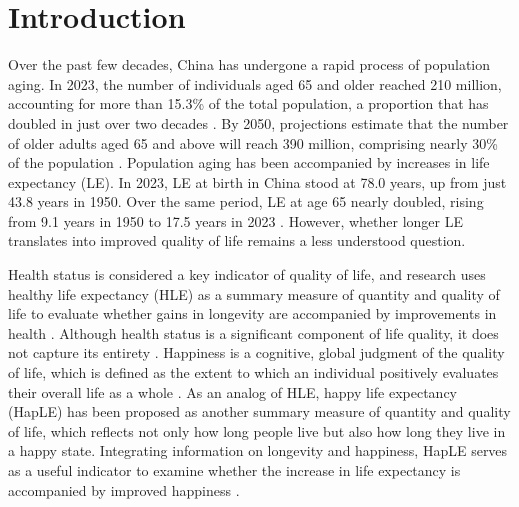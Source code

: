 \documentclass[12pt, a4paper]{article}
\begin{document}
\newpage
\section{Introduction}
Over the past few decades, China has undergone a rapid process of population aging. In 2023, the number of individuals aged 65 and older reached 210 million, accounting for more than 15.3\% of the total population, a proportion that has doubled in just over two decades \autocite{nationalbureauofstatisticsofchina.2023.china}. By 2050, projections estimate that the number of older adults aged 65 and above will reach 390 million, comprising nearly 30\% of the population \autocite{unitednations.2024.world}. Population aging has been accompanied by increases in life expectancy (LE). In 2023, LE at birth in China stood at 78.0 years, up from just 43.8 years in 1950. Over the same period, LE at age 65 nearly doubled, rising from 9.1 years in 1950 to 17.5 years in 2023 \autocite{unitednations.2024.world}. However, whether longer LE translates into improved quality of life remains a less understood question.

Health status is considered a key indicator of quality of life, and research uses healthy life expectancy (HLE) as a summary measure of quantity and quality of life to evaluate whether gains in longevity are accompanied by improvements in health \autocite{payne.2022.expansion,sanders.1964.measuring}. Although health status is a significant component of life quality, it does not capture its entirety \autocite{thewhoqolgroup.1998.development,yang.2008.long}. Happiness is a cognitive, global judgment of the quality of life, which is defined as the extent to which an individual positively evaluates their overall life as a whole \autocite{veenhoven.1996.study}. As an analog of HLE, happy life expectancy (HapLE) has been proposed as another summary measure of quantity and quality of life, which reflects not only how long people live but also how long they live in a happy state. Integrating information on longevity and happiness, HapLE serves as a useful indicator to examine whether the increase in life expectancy is accompanied by improved happiness \autocite{duan.2020.happy,yang.2008.long}.
\end{document}
